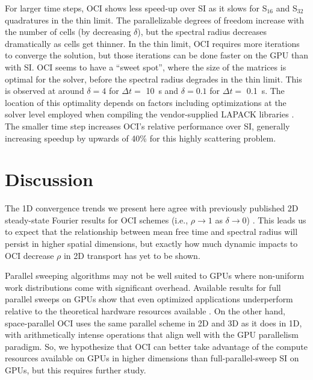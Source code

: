 For larger time steps, OCI shows less speed-up over SI as it slows for S$_{16}$ and S$_{32}$ quadratures in the thin limit.
The parallelizable degrees of freedom increase with the number of cells (by decreasing $\delta$), but the spectral radius decreases dramatically as cells get thinner.
In the thin limit, OCI requires more iterations to converge the solution, but those iterations can be done faster on the GPU than with SI.
OCI seems to have a ``sweet spot'', where the size of the matrices is optimal for the solver, before the spectral radius degrades in the thin limit.
This is observed at around $\delta=4$ for $\Delta t=$ \SI{10}{\s} and $\delta=0.1$ for $\Delta t=$ \SI{0.1}{\s}.
The location of this optimality depends on factors including optimizations at the solver level employed when compiling the vendor-supplied LAPACK libraries \cite{rocsolver}.
The smaller time step increases OCI's relative performance over SI, generally increasing speedup by upwards of 40\% for this highly scattering problem.

\section{Discussion}
\label{sec:therefore_disscusion}

The 1D convergence trends we present here agree with
previously published 2D steady-state Fourier results for OCI schemes 
(i.e., $\rho\rightarrow1$ as $\delta\rightarrow0$) \cite{rosa_cellwise_2013, man1994parallel}.
This leads us to expect that the relationship between mean free time and spectral radius will persist in higher spatial dimensions, 
but exactly how much dynamic impacts to OCI decrease $\rho$ in 2D transport has yet to be shown.

Parallel sweeping algorithms may not be well suited to GPUs where non-uniform work distributions come with significant overhead. 
Available results for full parallel sweeps on GPUs show that even optimized applications underperform relative to the theoretical hardware resources available \cite{Thomas_2024_profiling, wolfe2022roofline, kunen_kripke_2015, womeldorff_taking_2017, zerr_partisn_2019}.
On the other hand, space-parallel OCI uses the same parallel scheme in 2D and 3D as it does in 1D, with arithmetically intense operations that align well with the GPU parallelism paradigm.
So, we hypothesize that OCI can better take advantage of the compute resources available on GPUs in higher dimensions than full-parallel-sweep SI on GPUs, but this requires further study.

